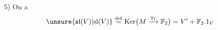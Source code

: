 5) On a
\[
\unsure{\mathfrak{sl}(V)|\mathrm{sl}(V)}
\overset{\mathrm{def}}{=}
\operatorname{Ker}\bigl(M\xrightarrow{\operatorname{Tr}}\mathbb F_2\bigr)
=V'+\mathbb F_2.1_V
\]
